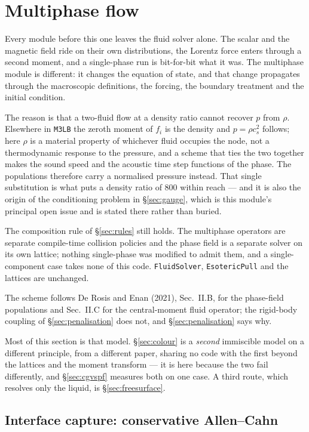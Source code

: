 \documentclass[11pt,a4paper]{article}
\newcommand{\code}[1]{\texttt{\small #1}}
\newcommand{\cs}{c_s}
\begin{document}
\section{Multiphase flow}
\label{sec:multiphase}

Every module before this one leaves the fluid solver alone. The scalar and the
magnetic field ride on their own distributions, the Lorentz force enters through
a second moment, and a single-phase run is bit-for-bit what it was. The
multiphase module is different: it changes the equation of state, and that change
propagates through the macroscopic definitions, the forcing, the boundary
treatment and the initial condition.

The reason is that a two-fluid flow at a density ratio cannot recover $p$ from
$\rho$. Elsewhere in \code{M3LB} the zeroth moment of $f_i$ is the density and
$p=\rho\cs^2$ follows; here $\rho$ is a material property of whichever fluid
occupies the node, not a thermodynamic response to the pressure, and a scheme
that ties the two together makes the sound speed and the acoustic time step
functions of the phase. The populations therefore carry a normalised pressure
instead. That single substitution is what puts a density ratio of $800$ within
reach --- and it is also the origin of the conditioning problem in
\S\ref{sec:gauge}, which is this module's principal open issue and is stated
there rather than buried.

The composition rule of \S\ref{sec:rules} still holds. The multiphase operators
are separate compile-time collision policies and the phase field is a separate
solver on its own lattice; nothing single-phase was modified to admit them, and
a single-component case takes none of this code. \code{FluidSolver},
\code{EsotericPull} and the lattices are unchanged.

The scheme follows De Rosis and Enan (2021), Sec.~II.B, for the phase-field
populations and Sec.~II.C for the central-moment fluid operator; the rigid-body
coupling of \S\ref{sec:penalisation} does not, and \S\ref{sec:penalisation}
says why.

Most of this section is that model. \S\ref{sec:colour} is a \emph{second}
immiscible model on a different principle, from a different paper, sharing no
code with the first beyond the lattices and the moment transform --- it is here
because the two fail differently, and \S\ref{sec:cgvspf} measures both on one
case. A third route, which resolves only the liquid, is \S\ref{sec:freesurface}.

\subsection{Interface capture: conservative Allen--Cahn}
\label{sec:ace}
\end{document}

